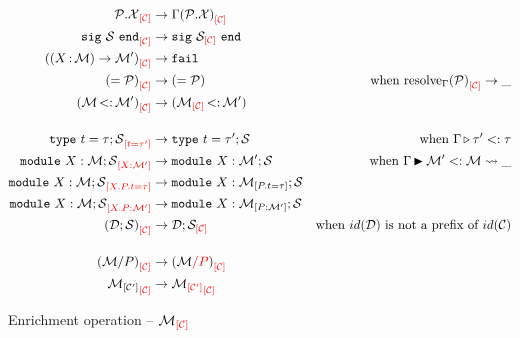 \begin{align*}
  \Oenrich{\iC}{\iP.\iX}
  &\to \Oenrich{\iC}{\lookup{\E}{\iP.\iX}}\\
  \Oenrich{\iC}{\Ssig{\iS}}
  &\to \Ssig{\Oenrich{\iC}{\iS}}\\
  \Oenrich{\iC}{(\Sfunctor{\ix}{\iM}{\iM'})}
  &\to \texttt{fail}\\
  \Oenrich{\iC}{\Salias{\iP}}
  &\to \Salias{\iP} &\text{when } \Oenrich{\iC}{\resolve{\E}{\iP}}\to \_\\
  \Oenrich{\iC}{\Stransp{\iM}{\iM'}}
  &\to \Stransp{\Oenrich{\iC}{\iM}}{\iM'}\\[4mm]
  \Oenrich{t = \tau'}{\Stype{t}{\tau};\iS}
  &\to \Stype{t}{\tau'};\iS
  &\text{when } \subtyp{\E}{\tau'}{\tau}\\
  \Oenrich{\ix : \iM'}{\Smodulety{\ix}{\iM};\iS}
  &\to \Smodulety{\ix}{\iM'};\iS
  &\text{when } \submod{\E}{\iM'}{\iM}{\_}\\
  \Oenrich{\ix.\ip.t = \tau}{\Smodulety{\ix}{\iM};\iS}
  &\to \Smodulety{\ix}{\Senrich{\ip.t = \tau}{\iM}};\iS\\
  \Oenrich{\ix.\ip : \iM'}{\Smodulety{\ix}{\iM};\iS}
  &\to \Smodulety{\ix}{\Senrich{\ip : \iM'}{\iM}};\iS\\
  \Oenrich{\iC}{(\iD;\iS)}
  &\to \iD;\Oenrich{\iC}{\iS}
  &\text{when } id(\iD) \text{ is not a prefix of } id(\iC)\\[4mm]
  \Oenrich{\iC}{(\Sstrengthen{l}{\ip}{\iM})}
  &\to \Oenrich{\iC}{(\Ostrengthen{l}{\ip}{\iM})}\\
  \Oenrich{\iC}{\Senrich{\iC'}{\iM}}
  &\to \Oenrich{\iC}{\Oenrich{\iC'}{\iM}}\\
\end{align*}\vspace{-3mm}
\caption{Enrichment operation -- $\Oenrich{\iC}{\iM}$}
\label{module:enrich}


